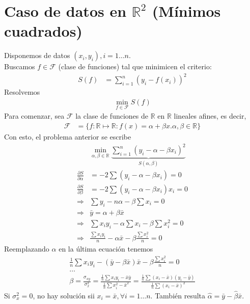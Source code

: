 \documentclass[10pt]{article}
\theoremstyle{plain}
\theoremstyle{definition}
\begin{document}
\section{Caso de datos en $\mathbb{R}^2$ (Mínimos cuadrados)}
Disponemos de datos $(x_{i},y_{i}), i = 1\ldots n$.\\
Buscamos $f\in \mathcal{F}$ (clase de funciones) tal que minimicen el criterio:
\begin{align*}
S(f) &= \sum_{i=1}^{n} (y_{i}-f(x_{i}))^2
\end{align*}
Resolvemos
\begin{align*}
\min_{f\in \mathcal{F}} S(f)
\end{align*}
Para comenzar, sea $\mathcal{F}$ la clase de funciones de $\mathbb{R}$ en $\mathbb{R}$ lineales afines, es decir,
\begin{align*}
\mathcal{F} &= \{f\colon \mathbb{R}\mapsto \mathbb{R} \colon f(x) = \alpha + \beta x. \alpha, \beta \in \mathbb{R}\}
\end{align*}
Con esto, el problema anterior se escribe
\begin{align*}
&\min_{\alpha, \beta \in \mathbb{R}} \underbrace{\sum_{i=1}^{n}(y_{i} - \alpha - \beta x_{i})^2}_{S(\alpha,\beta)}\\
\frac{\partial S}{\partial \alpha} &= -2\sum (y_{i} - \alpha - \beta x_{i}) = 0 \\
\frac{\partial S}{\partial \beta} &= -2\sum (y_{i} -\alpha -\beta x_{i})x_{i} = 0\\
\Rightarrow & \sum y_{i} - n\alpha - \beta\sum x_{i} = 0\\
\Rightarrow & \bar{y} = \alpha + \beta \bar{x}\\
\Rightarrow & \sum x_{i}y_{i} - \alpha\sum x_{i} - \beta\sum x_{i}^2 = 0\\
\Rightarrow & \frac{\sum x_{i}y_{i}}{n} - \alpha \bar{x} - \beta \frac{\sum x_{i}^2}{n} = 0
\end{align*}
Reemplazando $\alpha$ en la última ecuación tenemos
\begin{align*}
\frac{1}{n}  \sum x_{i}y_{i} - (\bar{y}- \beta \bar{x})\bar{x} - \beta \frac{\sum x_{i}^2}{n} = 0\\
\ldots \\
\beta = \frac{\sigma_{xy}}{\sigma_{x}^2} = \frac{\frac{1}{n}\sum x_{i}y_{i} - \bar{x}\bar{y}}{\frac{1}{n}\sum x_{i}^2 - \bar{x}^2} = \frac{\frac{1}{n}\sum (x_{i}- \bar{x})(y_{i}-\bar{y})}{\frac{1}{n}\sum (x_{i}-\bar{x})^2}
\end{align*}
Si $\sigma_{x}^2 = 0$, no hay solución sii $x_{i} = \bar{x}, \forall i = 1\ldots n$. También resulta $\hat{\alpha} = \bar{y} - \hat{\beta}\bar{x}$.\\
\end{document}
